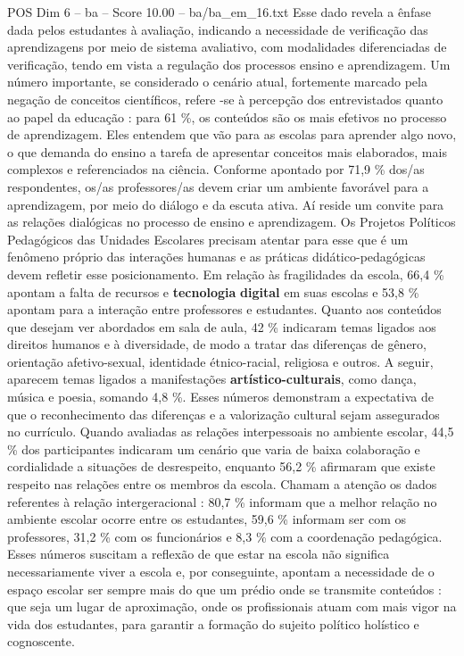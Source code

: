 \begin{textsample}{POS Dim 6 – ba – Score 10.00 – ba/ba\_em\_16.txt}
Esse dado revela a ênfase dada pelos estudantes à avaliação, indicando a necessidade de verificação das aprendizagens por meio de sistema avaliativo, com modalidades diferenciadas de verificação, tendo em vista a regulação dos processos ensino e aprendizagem.
Um número importante, se considerado o cenário atual, fortemente marcado pela negação de conceitos científicos, refere -se à percepção dos entrevistados quanto ao papel da educação : para 61 \%, os conteúdos são os mais efetivos no processo de aprendizagem.
Eles entendem que vão para as escolas para aprender algo novo, o que demanda do ensino a tarefa de apresentar conceitos mais elaborados, mais complexos e referenciados na ciência.
Conforme apontado por 71,9 \% dos/as respondentes, os/as professores/as devem criar um ambiente favorável para a aprendizagem, por meio do diálogo e da escuta ativa.
Aí reside um convite para as relações dialógicas no processo de ensino e aprendizagem.
Os Projetos Políticos Pedagógicos das Unidades Escolares precisam atentar para esse que é um fenômeno próprio das interações humanas e as práticas didático-pedagógicas devem refletir esse posicionamento.
Em relação às fragilidades da escola, 66,4 \% apontam a falta de recursos e \textbf{tecnologia} \textbf{digital} em suas escolas e 53,8 \% apontam para a interação entre professores e estudantes.
Quanto aos conteúdos que desejam ver abordados em sala de aula, 42 \% indicaram temas ligados aos direitos humanos e à diversidade, de modo a tratar das diferenças de gênero, orientação afetivo-sexual, identidade étnico-racial, religiosa e outros.
A seguir, aparecem temas ligados a manifestações \textbf{artístico-culturais}, como dança, música e poesia, somando 4,8 \%.
Esses números demonstram a expectativa de que o reconhecimento das diferenças e a valorização cultural sejam assegurados no currículo.
Quando avaliadas as relações interpessoais no ambiente escolar, 44,5 \% dos participantes indicaram um cenário que varia de baixa colaboração e cordialidade a situações de desrespeito, enquanto 56,2 \% afirmaram que existe respeito nas relações entre os membros da escola.
Chamam a atenção os dados referentes à relação intergeracional : 80,7 \% informam que a melhor relação no ambiente escolar ocorre entre os estudantes, 59,6 \% informam ser com os professores, 31,2 \% com os funcionários e 8,3 \% com a coordenação pedagógica.
Esses números suscitam a reflexão de que estar na escola não significa necessariamente viver a escola e, por conseguinte, apontam a necessidade de o espaço escolar ser sempre mais do que um prédio onde se transmite conteúdos : que seja um lugar de aproximação, onde os profissionais atuam com mais vigor na vida dos estudantes, para garantir a formação do sujeito político holístico e cognoscente.

\end{textsample}
